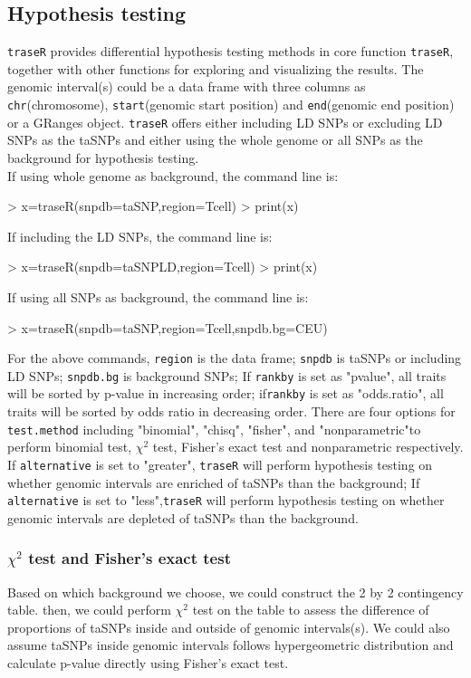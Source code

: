 \documentclass{article}
\begin{document}
\subsection{Hypothesis testing}
{\tt traseR} provides differential hypothesis testing methods in core function {\tt traseR}, together with other functions for exploring and visualizing the results. The genomic interval(s) could be a data frame with three columns as {\tt chr}(chromosome), {\tt start}(genomic start position) and {\tt end}(genomic end position) or a GRanges object. {\tt traseR} offers either including LD SNPs or excluding LD SNPs as the taSNPs and either using the whole genome or all SNPs as the background for hypothesis testing. \\
If using whole genome as background, the command line is:
\begin{Schunk}
\begin{Sinput}
> x=traseR(snpdb=taSNP,region=Tcell)
> print(x)
\end{Sinput}
\end{Schunk}
If including the LD SNPs, the command line is:
\begin{Schunk}
\begin{Sinput}
> x=traseR(snpdb=taSNPLD,region=Tcell)
> print(x)
\end{Sinput}
\end{Schunk}
If using all SNPs as background, the command line is:
\begin{Schunk}
\begin{Sinput}
> x=traseR(snpdb=taSNP,region=Tcell,snpdb.bg=CEU)
\end{Sinput}
\end{Schunk}
For the above commands, {\tt region} is the data frame; {\tt snpdb} is taSNPs or including LD SNPs; {\tt snpdb.bg} is background SNPs;  If {\tt rankby} is set as "pvalue", all traits will be sorted by p-value in increasing order; if{\tt rankby} is set as "odds.ratio", all traits will be sorted by odds ratio in decreasing order. There are four options for {\tt test.method} including "binomial", "chisq", "fisher", and "nonparametric"to perform binomial test, ${\chi}^2$ test, Fisher's exact test and nonparametric respectively. If {\tt alternative} is set to "greater", {\tt traseR} will perform hypothesis testing on whether genomic intervals are enriched of taSNPs than the background; If {\tt alternative} is set to "less",{\tt traseR} will perform hypothesis testing on whether genomic intervals are depleted of taSNPs than the background.
%

\subsubsection{${\chi}^2$  test and Fisher's exact test}
Based on which background we choose, we could construct the 2 by 2 contingency table. then, we could perform ${\chi}^2$ test on the table to assess the difference of proportions of taSNPs inside and outside of genomic intervals(s). We could also assume taSNPs inside genomic intervals follows hypergeometric distribution and calculate  p-value directly using Fisher's exact test.
\end{document}

